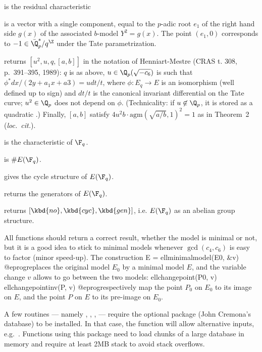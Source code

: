 \item {} is the residual characteristic

\item {} is a vector with a single component, equal to the $p$-adic
root $e_1$ of the right hand side $g(x)$ of the associated $b$-model $Y^2
= g(x)$. The point $(e_1,0)$ corresponds to $-1 \in \bar{\Q}_p^*/q^\Z$
under the Tate parametrization.

\item {} returns $[u^2,u,q,[a,b]]$ in the notation of Henniart-Mestre
(CRAS t. 308, p.~391--395, 1989): $q$ is as above, $u\in \Q_p(\sqrt{-c_6})$
is such that $\phi^* dx/(2y + a_1x+a3) = u dt/t$, where $\phi: E_q\to E$
is an isomorphism (well defined up to sign) and $dt/t$ is the canonical
invariant differential on the Tate curve; $u^2\in\Q_p$ does not depend on
$\phi$. (Technicality: if $u\not\in\Q_p$, it is stored as a quadratic
.)
Finally, $[a,b]$ satisfy $4u^2 b \cdot \text{agm}(\sqrt{a/b},1)^2 = 1$
as in Theorem~2 (\emph{loc.~cit.}).


\item {} is the characteristic of $\F_q$.

\item {} is $\#E(\F_q)$.

\item {} gives the cycle structure of $E(\F_q)$.

\item {} returns the generators of $E(\F_q)$.

\item {} returns $[\kbd{no},\kbd{cyc},\kbd{gen}]$, i.e. $E(\F_q)$
as an abelian group structure.


All functions should return a correct result, whether the model is minimal or
not, but it is a good idea to stick to minimal models whenever
$\gcd(c_4,c_6)$ is easy to factor (minor speed-up). The construction
\bprog
  E = ellminimalmodel(E0, &v)
@eprog\noindent replaces the original model $E_0$ by a minimal model $E$,
and the variable change $v$ allows to go between the two models:
\bprog
  ellchangepoint(P0, v)
  ellchangepointinv(P, v)
@eprog\noindent respectively map the point $P_0$ on $E_0$ to its image on
$E$, and the point $P$ on $E$ to its pre-image on $E_0$.

A few routines --- namely , ,
,  --- require the optional package 
(John Cremona's database) to be installed. In that case, the function
 will allow alternative inputs, e.g.~.
Functions using this package need to load chunks of a large database in
memory and require at least 2MB stack to avoid stack overflows.

